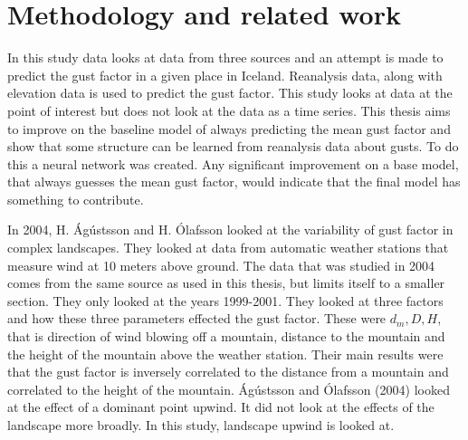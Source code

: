 \section{Methodology and related work}
In this study data looks at data from three sources and an attempt is made to predict the gust factor in a given place in Iceland.  Reanalysis data, along with elevation data is used to predict the gust factor. This study looks at data at the point of interest but does not look at the data as a time series. This thesis aims to improve on the baseline model of always predicting the mean gust factor and show that some structure can be learned from reanalysis data about gusts. To do this a neural network was created. Any significant improvement on a base model, that always guesses the mean gust factor, would indicate that the final model has something to contribute.

In 2004, H. Ágústsson and H. Ólafsson\cite{mean_gust_HA_HO} looked at the variability of gust factor in complex landscapes. They looked at data from automatic weather stations that measure wind at 10 meters above ground. The data that was studied in 2004 comes from the same source as used in this thesis, but limits itself to a smaller section. They only looked at the years 1999-2001. They looked at three factors and how these three parameters effected the gust factor. These were $d_m, D, H$, that is direction of wind blowing off a mountain, distance to the mountain and the height of the mountain above the weather station. Their main results were that the gust factor is inversely correlated to the distance from a mountain and correlated to the height of the mountain. Ágústsson and Ólafsson (2004) looked at the effect of a dominant point upwind. It did not look at the effects of the landscape more broadly. In this study, landscape upwind is looked at.


